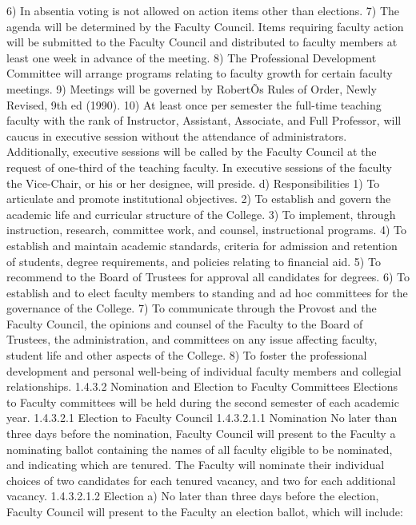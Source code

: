 \documentclass[letterpaper, 11pt]{article}
\begin{document}
6) In absentia voting is not allowed on action items other than elections.
7) The agenda will be determined by the Faculty Council.  Items requiring faculty action will be submitted to the Faculty Council and distributed to faculty members at least one week in advance of the meeting.
8) The Professional Development Committee will arrange programs relating to faculty growth for certain faculty meetings.
9) Meetings will be governed by RobertÕs Rules of Order, Newly Revised, 9th ed (1990).
10) At least once per semester the full-time teaching faculty with the rank of Instructor, Assistant, Associate, and Full Professor, will caucus in executive session without the attendance of administrators.  Additionally, executive sessions will be called by the Faculty Council at the request of one-third of the teaching faculty.  In executive sessions of the faculty the Vice-Chair, or his or her designee, will preside.
d) Responsibilities
1) To articulate and promote institutional objectives.
2) To establish and govern the academic life and curricular structure of the College.
3) To implement, through instruction, research, committee work, and counsel, instructional programs.
4) To establish and maintain academic standards, criteria for admission and retention of students, degree requirements, and policies relating to financial aid.
5) To recommend to the Board of Trustees for approval all candidates for degrees.
6) To establish and to elect faculty members to standing and ad hoc committees for the governance of the College.
7) To communicate through the Provost and the Faculty Council, the opinions and counsel of the Faculty to the Board of Trustees, the administration, and committees on any issue affecting faculty, student life and other aspects of the College.
8) To foster the professional development and personal well-being of individual faculty members and collegial relationships.
1.4.3.2 	Nomination and Election to Faculty Committees
   Elections to Faculty committees will be held during the second semester of each academic year.
1.4.3.2.1 Election to Faculty Council
1.4.3.2.1.1 Nomination
   No later than three days before the nomination, Faculty Council will present to the Faculty a nominating ballot containing the names of all faculty eligible to be nominated, and indicating which are tenured.  The Faculty will nominate their individual choices of two candidates for each tenured vacancy, and two for each additional vacancy.
1.4.3.2.1.2 Election
a) No later than three days before the election, Faculty Council will present to the Faculty an election ballot, which will include:
\end{document}
